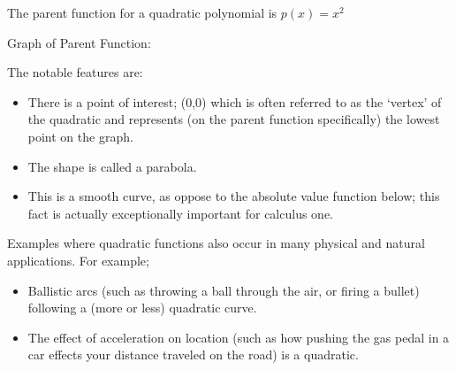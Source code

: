 \documentclass{ximeraXloud}
\begin{document}
        \begin{description}
            \item[Parent Function:] The parent function for a quadratic polynomial is $p(x) = x^2$\\
            \begin{minipage}{\textwidth}\item[Graph of Parent Function:]\hspace*{0pt} \\
                \begin{center}
                \end{center}
            \end{minipage}
            
            \item[Notable Features of Graph:] The notable features are:
            \begin{itemize}
                \item There is a point of interest; (0,0) which is often referred to as the `vertex' of the quadratic and represents (on the parent function specifically) the lowest point on the graph.
                \item The shape is called a parabola.%
                \item This is a smooth curve, as oppose to the absolute value function below; this fact is actually exceptionally important for calculus one.
            \end{itemize}
            
            \item[Example usage:] Examples where quadratic functions also occur in many physical and natural applications. For example;
            \begin{itemize}
                \item Ballistic arcs (such as throwing a ball through the air, or firing a bullet) following a (more or less) quadratic curve. 
                \item The effect of acceleration on location (such as how pushing the gas pedal in a car effects your distance traveled on the road) is a quadratic.
            \end{itemize}
        \end{description}
        
\end{document}
